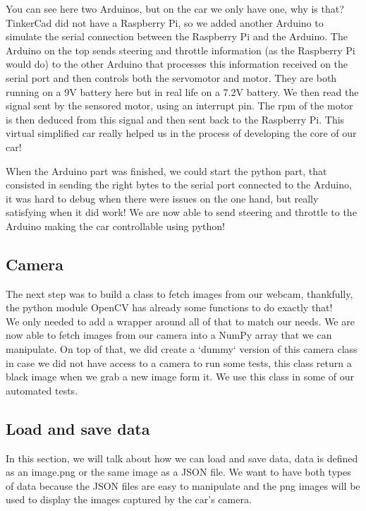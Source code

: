 \documentclass[12pt]{article}
\begin{document}
You can see here two Arduinos, but on the car we only have one, why is that? TinkerCad did not have a Raspberry Pi, so we added another Arduino to simulate the serial connection between the Raspberry Pi and the Arduino. The Arduino on the top sends steering and throttle information (as the Raspberry Pi would do) to the other Arduino that processes this information received on the serial port and then controls both the servomotor and motor. They are both running on a 9V battery here but in real life on a 7.2V battery. We then read the signal sent by the sensored motor, using an interrupt pin. The rpm of the motor is then deduced from this signal and then sent back to the Raspberry Pi.
This virtual simplified car really helped us in the process of developing the core of our car!

When the Arduino part was finished, we could start the python part, that consisted in sending the right bytes to the serial port connected to the Arduino, it was hard to debug when there were issues on the one hand, but really satisfying when it did work! We are now able to send steering and throttle to the Arduino making the car controllable using python!

\subsection{Camera}
The next step was to build a class to fetch images from our webcam, thankfully, the python module OpenCV has already some functions to do exactly that! \\
We only needed to add a wrapper around all of that to match our needs. We are now able to fetch images from our camera into a NumPy array that we can manipulate. On top of that, we did create a `dummy` version of this camera class in case we did not have access to a camera to run some tests, this class return a black image when we grab a new image form it. We use this class in some of our automated tests.

\newpage 

\subsection{Load and save data}
In this section, we will talk about how we can load and save data, data is defined as an image.png or the same image as a JSON file. We want to have both types of data because the JSON files are easy to manipulate and the png images will be used to display the images captured by the car's camera.\\
\end{document}

